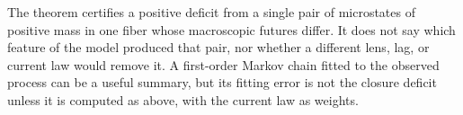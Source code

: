 \begin{remark}
The theorem certifies a positive deficit from a single pair of microstates of positive mass in one fiber whose macroscopic futures differ.
It does not say which feature of the model produced that pair, nor whether a different lens, lag, or current law would remove it.
A first-order Markov chain fitted to the observed process can be a useful summary, but its fitting error is not the closure deficit unless it is computed as above, with the current law as weights.
\end{remark}
